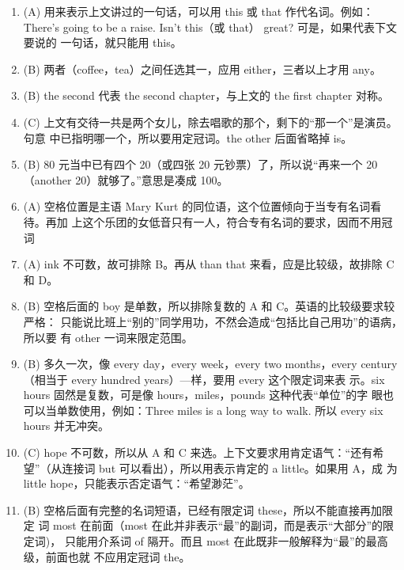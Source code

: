 \documentclass{yufa}
\begin{document}
\begin{enumerate}
\item (A) 用来表示上文讲过的一句话，可以用 this 或 that 作代名词。例如：There's
  going to be a raise. Isn't this（或 that） great? 可是，如果代表下文要说的
  一句话，就只能用 this。

\item (B) 两者（coffee，tea）之间任选其一，应用 either，三者以上才用 any。

\item (B) the second 代表 the second chapter，与上文的 the first chapter 对称。

\item (C) 上文有交待一共是两个女儿，除去唱歌的那个，剩下的“那一个”是演员。句意
  中已指明哪一个，所以要用定冠词。the other 后面省略掉 is。

\item (B) 80 元当中已有四个 20（或四张 20 元钞票）了，所以说“再来一个 20（another 20）就够了。”意思是凑成 100。

\item (A) 空格位置是主语 Mary Kurt 的同位语，这个位置倾向于当专有名词看待。再加
  上这个乐团的女低音只有一人，符合专有名词的要求，因而不用冠词

\item (A) ink 不可数，故可排除 B。再从 than that 来看，应是比较级，故排除 C 和 D。

\item (B) 空格后面的 boy 是单数，所以排除复数的 A 和 C。英语的比较级要求较严格：
  只能说比班上“别的”同学用功，不然会造成“包括比自己用功”的语病，所以要
  有 other 一词来限定范围。

\item (B) 多久一次，像 every day，every week，every two months，every
  century（相当于 every hundred years）—样，要用 every 这个限定词来表
  示。six hours 固然是复数，可是像 hours，miles，pounds 这种代表“单位”的字
  眼也可以当单数使用，例如：Three miles is a long way to walk. 所以 every
  six hours 并无冲突。

\item (C) hope 不可数，所以从 A 和 C 来选。上下文要求用肯定语气：“还有希
  望”（从连接词 but 可以看出），所以用表示肯定的 a little。如果用 A，成
  为 little hope，只能表示否定语气：“希望渺茫”。


\item (B) 空格后面有完整的名词短语，已经有限定词 these，所以不能直接再加限定
  词 most 在前面（most 在此并非表示“最”的副词，而是表示“大部分”的限定词)，
  只能用介系词 of 隔开。而且 most 在此既非一般解释为“最”的最高级，前面也就
  不应用定冠词 the。

\end{enumerate}
\end{document}
